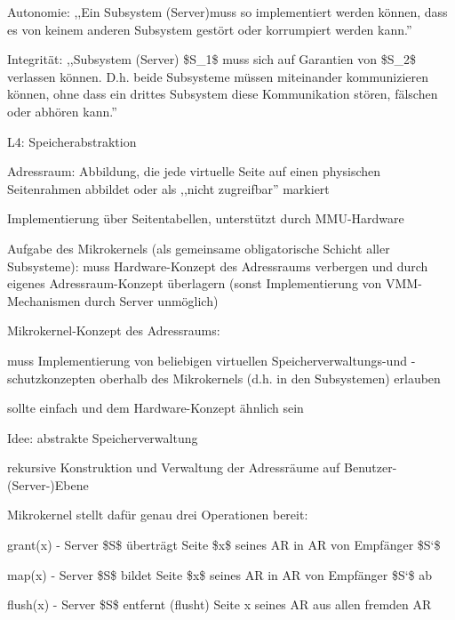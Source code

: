 \documentclass[a4paper]{article}
\begin{document}
\begin{multicols}{3}
    \begin{enumerate*}
        \item
        Autonomie: ,,Ein Subsystem (Server)muss so implementiert werden
        können, dass es von keinem anderen Subsystem gestört oder korrumpiert
        werden kann.''
        \item
        Integrität: ,,Subsystem (Server) \$S\_1\$ muss sich auf Garantien von
        \$S\_2\$ verlassen können. D.h. beide Subsysteme müssen miteinander
        kommunizieren können, ohne dass ein drittes Subsystem diese
        Kommunikation stören, fälschen oder abhören kann.''
    \end{enumerate*}

    L4: Speicherabstraktion

    \begin{itemize*}
        \item
        Adressraum: Abbildung, die jede virtuelle Seite auf einen physischen
        Seitenrahmen abbildet oder als ,,nicht zugreifbar'' markiert
        \item
        Implementierung über Seitentabellen, unterstützt durch MMU-Hardware
        \item
        Aufgabe des Mikrokernels (als gemeinsame obligatorische Schicht aller
        Subsysteme): muss Hardware-Konzept des Adressraums verbergen und durch
        eigenes Adressraum-Konzept überlagern (sonst Implementierung von
        VMM-Mechanismen durch Server unmöglich)
        \item
        Mikrokernel-Konzept des Adressraums:
        \begin{itemize*}
            \item muss Implementierung von beliebigen virtuellen Speicherverwaltungs-und -schutzkonzepten oberhalb des Mikrokernels (d.h. in den Subsystemen) erlauben
            \item sollte einfach und dem Hardware-Konzept ähnlich sein
        \end{itemize*}
        \item
        Idee: abstrakte Speicherverwaltung
        \begin{itemize*}
            \item rekursive Konstruktion und Verwaltung der Adressräume auf Benutzer-(Server-)Ebene
            \item Mikrokernel stellt dafür genau drei Operationen bereit: \begin{enumerate*}  \item   grant(x) - Server \$S\$ überträgt Seite \$x\$ seines AR in AR von   Empfänger \$S`\$ \item   map(x) - Server \$S\$ bildet Seite \$x\$ seines AR in AR von   Empfänger \$S`\$ ab \item   flush(x) - Server \$S\$ entfernt (flusht) Seite x seines AR aus   allen fremden AR \end{enumerate*}
        \end{itemize*}
    \end{itemize*}


\end{multicols}
\end{document}
